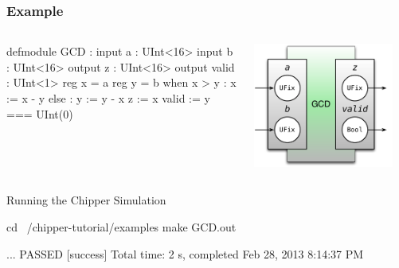 \documentclass[xcolor=pdflatex,dvipsnames,table]{beamer}
\begin{document}
\begin{frame}[fragile]
\frametitle{Example}
\begin{columns}


\begin{footnotesize}
\begin{stanza}
defmodule GCD :
  input a      : UInt<16>
  input b      : UInt<16>
  output z     : UInt<16>
  output valid : UInt<1>
  reg x = a
  reg y = b
  when x > y :
    x := x - y
  else :
    y := y - x
  z     := x
  valid := y === UInt(0)
\end{stanza}
\end{footnotesize}


\begin{center}
\includegraphics[width=0.9\textwidth]{figs/gcd.pdf} 
\end{center}

\end{columns}
\end{frame}

\begin{frame}[fragile]{Running the Chipper Simulation}

\begin{bash}
cd ~/chipper-tutorial/examples
make GCD.out
\end{bash}

{
\begin{bash}
...
PASSED
[success] Total time: 2 s, completed Feb 28, 2013 8:14:37 PM
\end{bash}
}

\end{frame}
\end{document}
